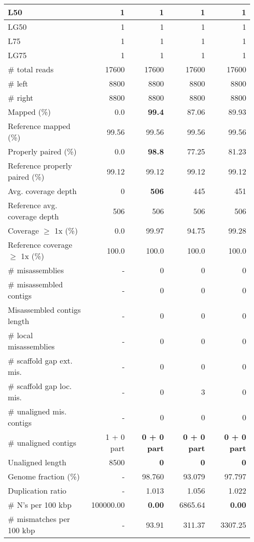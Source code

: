 \documentclass[12pt,a4paper]{article}
\begin{document}
\begin{table}[ht]
\begin{center}
\begin{tabular}{|l*{4}{|r}|}
L50 & 1 & 1 & 1 & 1 \\ \hline
LG50 & 1 & 1 & 1 & 1 \\ \hline
L75 & 1 & 1 & 1 & 1 \\ \hline
LG75 & 1 & 1 & 1 & 1 \\ \hline
\# total reads & 17600 & 17600 & 17600 & 17600 \\ \hline
\# left & 8800 & 8800 & 8800 & 8800 \\ \hline
\# right & 8800 & 8800 & 8800 & 8800 \\ \hline
Mapped (\%) & 0.0 & {\bf 99.4} & 87.06 & 89.93 \\ \hline
Reference mapped (\%) & 99.56 & 99.56 & 99.56 & 99.56 \\ \hline
Properly paired (\%) & 0.0 & {\bf 98.8} & 77.25 & 81.23 \\ \hline
Reference properly paired (\%) & 99.12 & 99.12 & 99.12 & 99.12 \\ \hline
Avg. coverage depth & 0 & {\bf 506} & 445 & 451 \\ \hline
Reference avg. coverage depth & 506 & 506 & 506 & 506 \\ \hline
Coverage $\geq$ 1x (\%) & 0.0 & 99.97 & 94.75 & 99.28 \\ \hline
Reference coverage $\geq$ 1x (\%) & 100.0 & 100.0 & 100.0 & 100.0 \\ \hline
\# misassemblies & - & 0 & 0 & 0 \\ \hline
\# misassembled contigs & - & 0 & 0 & 0 \\ \hline
Misassembled contigs length & - & 0 & 0 & 0 \\ \hline
\# local misassemblies & - & 0 & 0 & 0 \\ \hline
\# scaffold gap ext. mis. & - & 0 & 0 & 0 \\ \hline
\# scaffold gap loc. mis. & - & 0 & 3 & 0 \\ \hline
\# unaligned mis. contigs & - & 0 & 0 & 0 \\ \hline
\# unaligned contigs & 1 + 0 part & {\bf 0 + 0 part} & {\bf 0 + 0 part} & {\bf 0 + 0 part} \\ \hline
Unaligned length & 8500 & {\bf 0} & {\bf 0} & {\bf 0} \\ \hline
Genome fraction (\%) & - & 98.760 & 93.079 & 97.797 \\ \hline
Duplication ratio & - & 1.013 & 1.056 & 1.022 \\ \hline
\# N's per 100 kbp & 100000.00 & {\bf 0.00} & 6865.64 & {\bf 0.00} \\ \hline
\# mismatches per 100 kbp & - & 93.91 & 311.37 & 3307.25 \\ \hline

\end{tabular}
\end{center}
\end{table}
\end{document}
